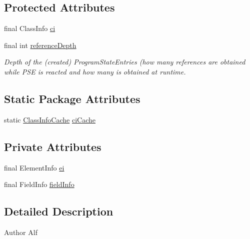 \subsection*{Protected Attributes}
\begin{DoxyCompactItemize}
\item 
final Class\+Info \hyperlink{classgov_1_1nasa_1_1jpf_1_1inspector_1_1server_1_1programstate_1_1_state_value_a0eb4aa1e630ed6372dcfb8c41ae7edc5}{ci}
\item 
final int \hyperlink{classgov_1_1nasa_1_1jpf_1_1inspector_1_1server_1_1programstate_1_1_state_node_a55683618625dae46e8aa68d95811d6bb}{reference\+Depth}
\begin{DoxyCompactList}\small\item\em Depth of the (created) Program\+State\+Entries (how many references are obtained while P\+SE is reacted and how many is obtained at runtime. \end{DoxyCompactList}\end{DoxyCompactItemize}
\subsection*{Static Package Attributes}
\begin{DoxyCompactItemize}
\item 
static \hyperlink{classgov_1_1nasa_1_1jpf_1_1inspector_1_1utils_1_1_class_info_cache}{Class\+Info\+Cache} \hyperlink{classgov_1_1nasa_1_1jpf_1_1inspector_1_1server_1_1programstate_1_1_state_value_a38182b5018580765f3f2cdc9e96e1ca2}{ci\+Cache}
\end{DoxyCompactItemize}
\subsection*{Private Attributes}
\begin{DoxyCompactItemize}
\item 
final Element\+Info \hyperlink{classgov_1_1nasa_1_1jpf_1_1inspector_1_1server_1_1programstate_1_1_state_value_element_info_field_a5e6f3ff034c98330007fe320eb5ec253}{ei}
\item 
final Field\+Info \hyperlink{classgov_1_1nasa_1_1jpf_1_1inspector_1_1server_1_1programstate_1_1_state_value_element_info_field_a5688eca8dae926e6e6a8b50aeab0c279}{field\+Info}
\end{DoxyCompactItemize}


\subsection{Detailed Description}
\begin{DoxyAuthor}{Author}
Alf 
\end{DoxyAuthor}


